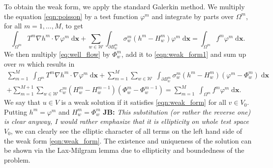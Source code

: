 \documentclass{elsarticle}
\def\vc#1{\mathbf{\boldsymbol{#1}}}     %
\def\avg#1{\langle#1\rangle}
\newcommand{\dd}{\; \mathrm{d}}
\newcommand{\bx}{\vc{x}}
\newcommand{\noteJB}[1]{{\color{Blue} \textbf{JB: } \textit{#1}}}
\begin{document}
To obtain the weak form, we apply the standard Galerkin method. We multiply the equation \eqref{eqn:poisson} 
by a test function $\varphi^m$ and integrate by parts over $\Omega^m$, for all $m=1,\ldots,M$, to get
\begin{equation} \label{eqn:weak_form1}
  \int_{\Omega^m} T^m \nabla h^m \cdot \nabla \varphi^m \dd\bx
  + \sum_{w\in \mathcal{W}} \int_{\partial B^m_w} \sigma^m_w (h^m - H_w^m) \varphi^m \dd\bx
  = \int_{\Omega^m} f^m\varphi^m \dd\bx.
\end{equation}
We then multiply \eqref{eq:well_flow} by $\Phi^m_w$, add it to \eqref{eqn:weak_form1} 
and sum up over $m$ which results in
\begin{multline} \label{eqn:weak_form}
  \sum_{m=1}^M \; \int_{\Omega^m} T^m \nabla h^m \cdot \nabla \varphi^m \dd\bx
        + \sum_{m=1}^M \sum_{w\in \mathcal{W}} \; 
           \int_{\partial B^m_w} \sigma^m_w\left(h^m-H^m_w\right)\left(\varphi^m-\Phi^m_w\right) \dd\bx \\
        + \sum_{m=1}^{M+1} \sum_{w\in\mathcal{W}}
          c_w^{m}\left( H^{m}_w-H_w^{m-1}\right)\left(\Phi^{m}_w - \Phi^{m-1}_w\right)           
  = \sum_{m=1}^M \; \int_{\Omega^m} f^m\varphi^m \dd\bx.   
\end{multline}
We say that $u\in V$ is a weak solution if it satisfies \eqref{eqn:weak_form} for all $v\in V_0$. 
Putting $h^m=\varphi^m$ and $H^m_w=\Phi^m_w$ \noteJB{This substitution (or rather the reverse one) is clear anyway, 
I would rather emphasize that it is ellipticity on whole test space $V_0$}, we can clearly see the elliptic character of all terms on the 
left hand side of the weak form \eqref{eqn:weak_form}. The existence and uniqueness of the solution can be shown 
via the Lax-Milgram lemma due to ellipticity and boundedness of the problem.
\end{document}
